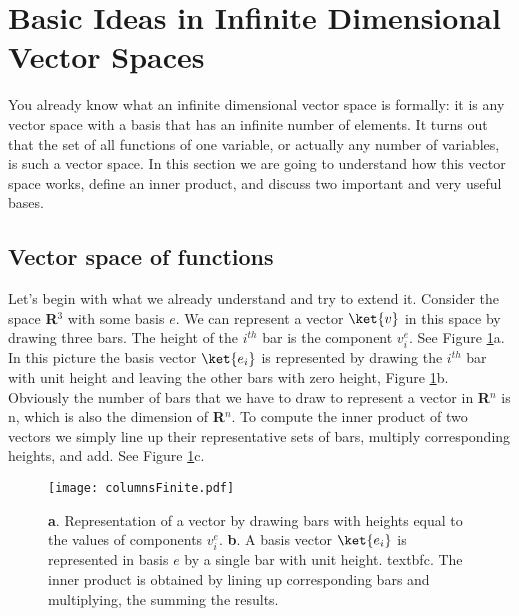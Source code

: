 \section{Basic Ideas in Infinite Dimensional Vector Spaces}
You already know what an infinite dimensional vector space is formally: it is any vector space with a basis that has an infinite number of elements. It turns out that the set of all functions of one variable, or actually any number of variables, is such a vector space. In this section we are going to understand how this vector space works, define an inner product, and discuss two important and very useful bases.

\subsection{Vector space of functions}
Let's begin with what we already understand and try to extend it.  Consider the space \textbf{R}$^3$ with some basis $e$.  We can represent a vector $\ket{v}$ in this space by drawing three bars.  The height of the $i^{th}$ bar is the component $v^e_i$.  See Figure \ref{Fig:columnsFinite}a.  In this picture the basis vector $\ket{e_i}$ is represented by drawing the $i^{th}$ bar with unit height and leaving the other bars with zero height, Figure \ref{Fig:columnsFinite}b. Obviously the number of bars that we have to draw to represent a vector in \textbf{R}$^n$ is n, which is also the dimension of \textbf{R}$^n$.  To compute the inner product of two vectors we simply line up their representative sets of bars, multiply corresponding heights, and add. See Figure \ref{Fig:columnsFinite}c.

\begin{figure}
\begin{centering}
\texttt{[image: columnsFinite.pdf]}
\par\end{centering}
\caption{\textbf{a}. Representation of a vector by drawing bars with heights equal to the values of components $v_i^e$. \textbf{b}. A basis vector $\ket{e_i}$ is represented in basis $e$ by a single bar with unit height. textbf{c}. The inner product is obtained by lining up corresponding bars and multiplying, the summing the results.}
\label{Fig:columnsFinite}
\end{figure}

